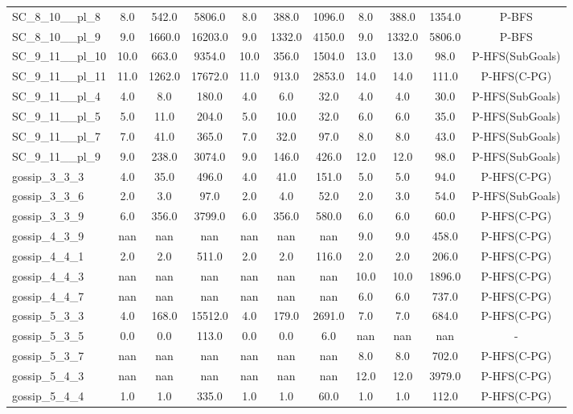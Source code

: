 \begin{table}[!ht]
\begin{tabular}{l|ccc|ccc|cccc}
SC\_8\_10\_\_pl\_8 & 8.0 & 542.0 & 5806.0 & 8.0 & 388.0 & 1096.0 & 8.0 & 388.0 & 1354.0 & P-BFS \\
SC\_8\_10\_\_pl\_9 & 9.0 & 1660.0 & 16203.0 & 9.0 & 1332.0 & 4150.0 & 9.0 & 1332.0 & 5806.0 & P-BFS \\
SC\_9\_11\_\_pl\_10 & 10.0 & 663.0 & 9354.0 & 10.0 & 356.0 & 1504.0 & 13.0 & 13.0 & 98.0 & P-HFS(SubGoals) \\
SC\_9\_11\_\_pl\_11 & 11.0 & 1262.0 & 17672.0 & 11.0 & 913.0 & 2853.0 & 14.0 & 14.0 & 111.0 & P-HFS(C-PG) \\
SC\_9\_11\_\_pl\_4 & 4.0 & 8.0 & 180.0 & 4.0 & 6.0 & 32.0 & 4.0 & 4.0 & 30.0 & P-HFS(SubGoals) \\
SC\_9\_11\_\_pl\_5 & 5.0 & 11.0 & 204.0 & 5.0 & 10.0 & 32.0 & 6.0 & 6.0 & 35.0 & P-HFS(SubGoals) \\
SC\_9\_11\_\_pl\_7 & 7.0 & 41.0 & 365.0 & 7.0 & 32.0 & 97.0 & 8.0 & 8.0 & 43.0 & P-HFS(SubGoals) \\
SC\_9\_11\_\_pl\_9 & 9.0 & 238.0 & 3074.0 & 9.0 & 146.0 & 426.0 & 12.0 & 12.0 & 98.0 & P-HFS(SubGoals) \\
gossip\_3\_3\_3 & 4.0 & 35.0 & 496.0 & 4.0 & 41.0 & 151.0 & 5.0 & 5.0 & 94.0 & P-HFS(C-PG) \\
gossip\_3\_3\_6 & 2.0 & 3.0 & 97.0 & 2.0 & 4.0 & 52.0 & 2.0 & 3.0 & 54.0 & P-HFS(SubGoals) \\
gossip\_3\_3\_9 & 6.0 & 356.0 & 3799.0 & 6.0 & 356.0 & 580.0 & 6.0 & 6.0 & 60.0 & P-HFS(C-PG) \\
gossip\_4\_3\_9 & nan & nan & nan & nan & nan & nan & 9.0 & 9.0 & 458.0 & P-HFS(C-PG) \\
gossip\_4\_4\_1 & 2.0 & 2.0 & 511.0 & 2.0 & 2.0 & 116.0 & 2.0 & 2.0 & 206.0 & P-HFS(C-PG) \\
gossip\_4\_4\_3 & nan & nan & nan & nan & nan & nan & 10.0 & 10.0 & 1896.0 & P-HFS(C-PG) \\
gossip\_4\_4\_7 & nan & nan & nan & nan & nan & nan & 6.0 & 6.0 & 737.0 & P-HFS(C-PG) \\
gossip\_5\_3\_3 & 4.0 & 168.0 & 15512.0 & 4.0 & 179.0 & 2691.0 & 7.0 & 7.0 & 684.0 & P-HFS(C-PG) \\
gossip\_5\_3\_5 & 0.0 & 0.0 & 113.0 & 0.0 & 0.0 & 6.0 & nan & nan & nan & - \\
gossip\_5\_3\_7 & nan & nan & nan & nan & nan & nan & 8.0 & 8.0 & 702.0 & P-HFS(C-PG) \\
gossip\_5\_4\_3 & nan & nan & nan & nan & nan & nan & 12.0 & 12.0 & 3979.0 & P-HFS(C-PG) \\
gossip\_5\_4\_4 & 1.0 & 1.0 & 335.0 & 1.0 & 1.0 & 60.0 & 1.0 & 1.0 & 112.0 & P-HFS(C-PG) \\

\end{tabular}
\end{table}
